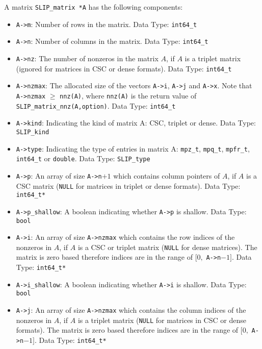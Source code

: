 \documentclass[12pt]{article}
\theoremstyle{definition}
\begin{document}
A matrix \verb|SLIP_matrix *A| has the following components:

\begin{itemize}
\item \verb|A->m|: Number of rows in the matrix. Data Type: \verb|int64_t|

\item \verb|A->n|: Number of columns in the matrix. Data Type: \verb|int64_t|

\item \verb|A->nz|: The number of nonzeros in the matrix $A$, if $A$ is
a triplet matrix (ignored for matrices in CSC or dense formats). Data Type:
\verb|int64_t|

\item \verb|A->nzmax|: The allocated size of the vectors \verb|A->i|, \verb|A->j| and \verb|A->x|. Note that \verb|A->nzmax| $\geq$ \verb|nnz(A)|, where
\verb'nnz(A)' is the return value of \verb'SLIP_matrix_nnz(A,option)'.
Data Type: \verb|int64_t|

\item \verb|A->kind|: Indicating the kind of matrix A: CSC, triplet or dense.
Data Type: \verb|SLIP_kind|

\item \verb|A->type|: Indicating the type of entries in matrix A: \verb|mpz_t|,
\verb|mpq_t|, \verb|mpfr_t|, \verb|int64_t| or \verb|double|.
Data Type: \verb|SLIP_type|

\item \verb|A->p|: An array of size \verb|A->n|$+1$ which contains column pointers
of $A$, if $A$ is a CSC matrix (\verb|NULL| for matrices in triplet or dense
formats). Data Type: \verb|int64_t*|

\item \verb|A->p_shallow|: A boolean indicating whether \verb|A->p| is shallow.
Data Type: \verb|bool|

\item \verb|A->i|: An array of size \verb|A->nzmax| which contains the row
indices of the nonzeros in $A$, if $A$ is a CSC or triplet matrix (\verb|NULL|
for dense matrices). The matrix is zero based therefore indices are
in the range of $[0,$ \verb|A->n|$-1]$. Data Type: \verb|int64_t*|

\item \verb|A->i_shallow|: A boolean indicating whether \verb|A->i| is shallow.
Data Type: \verb|bool|

\item \verb|A->j|: An array of size \verb|A->nzmax| which contains the column
indices of the nonzeros in $A$, if $A$ is a triplet matrix (\verb|NULL| for
matrices in CSC or dense formats).
The matrix is zero based therefore indices are
in the range of $[0,$ \verb|A->n|$-1]$. Data Type: \verb|int64_t*|


\end{itemize}
\end{document}
